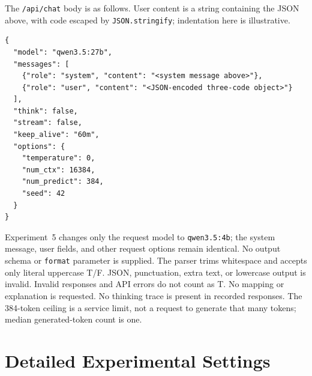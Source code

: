 The \nolinkurl{/api/chat} body is as follows. User content is a string containing the JSON above, with code escaped by \texttt{JSON.stringify}; indentation here is illustrative.
\begin{lstlisting}
{
  "model": "qwen3.5:27b",
  "messages": [
    {"role": "system", "content": "<system message above>"},
    {"role": "user", "content": "<JSON-encoded three-code object>"}
  ],
  "think": false,
  "stream": false,
  "keep_alive": "60m",
  "options": {
    "temperature": 0,
    "num_ctx": 16384,
    "num_predict": 384,
    "seed": 42
  }
}
\end{lstlisting}
Experiment~5 changes only the request model to \texttt{qwen3.5:4b}; the system message, user fields, and other request options remain identical. No output schema or \texttt{format} parameter is supplied. The parser trims whitespace and accepts only literal uppercase T/F. JSON, punctuation, extra text, or lowercase output is invalid. Invalid responses and API errors do not count as T. No mapping or explanation is requested. No thinking trace is present in recorded responses. The 384-token ceiling is a service limit, not a request to generate that many tokens; median generated-token count is one.

\section{Detailed Experimental Settings}
\label{sec:detailed-settings}
